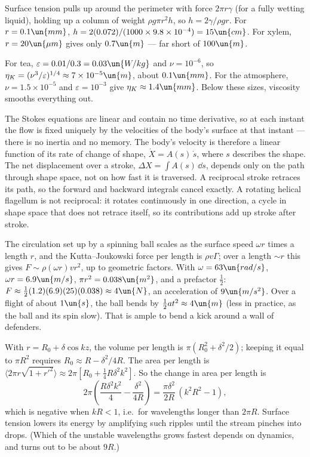  Surface tension pulls up around the perimeter with force $2\pi r\gamma$ (for a fully wetting liquid), holding up a column of weight $\rho g\pi r^2h$, so $h = 2\gamma/\rho gr$. For $r = 0.1\un{mm}$, $h = 2(0.072)/(1000\times9.8\times10^{-4}) = 15\un{cm}$. For xylem, $r = 20\un{\mu m}$ gives only $0.7\un{m}$ --- far short of $100\un{m}$.

 For tea, $\varepsilon = 0.01/0.3 = 0.03\un{W/kg}$ and $\nu = 10^{-6}$, so $\eta_K = (\nu^3/\varepsilon)^{1/4}\approx7\times10^{-5}\un{m}$, about $0.1\un{mm}$. For the atmosphere, $\nu = 1.5\times10^{-5}$ and $\varepsilon = 10^{-3}$ give $\eta_K\approx1.4\un{mm}$. Below these sizes, viscosity smooths everything out.

 The Stokes equations are linear and contain no time derivative, so at each instant the flow is fixed uniquely by the velocities of the body's surface at that instant --- there is no inertia and no memory. The body's velocity is therefore a linear function of its rate of change of shape, $\dot X = A(s)\,\dot s$, where $s$ describes the shape. The net displacement over a stroke, $\Delta X = \int A(s)\,\dd s$, depends only on the path through shape space, not on how fast it is traversed. A reciprocal stroke retraces its path, so the forward and backward integrals cancel exactly. A rotating helical flagellum is not reciprocal: it rotates continuously in one direction, a cycle in shape space that does not retrace itself, so its contributions add up stroke after stroke.

 The circulation set up by a spinning ball scales as the surface speed $\omega r$ times a length $r$, and the Kutta--Joukowski force per length is $\rho v\Gamma$; over a length $\sim r$ this gives $F\sim\rho(\omega r)vr^2$, up to geometric factors. With $\omega = 63\un{rad/s}$, $\omega r = 6.9\un{m/s}$, $\pi r^2 = 0.038\un{m^2}$, and a prefactor $\tfrac12$: $F\approx\tfrac12(1.2)(6.9)(25)(0.038)\approx4\un{N}$, an acceleration of $9\un{m/s^2}$. Over a flight of about $1\un{s}$, the ball bends by $\tfrac12at^2\approx4\un{m}$ (less in practice, as the ball and its spin slow). That is ample to bend a kick around a wall of defenders.

 With $r = R_0 + \delta\cos kz$, the volume per length is $\pi(R_0^2 + \delta^2/2)$; keeping it equal to $\pi R^2$ requires $R_0\approx R - \delta^2/4R$. The area per length is $\langle2\pi r\sqrt{1+r'^2}\rangle\approx2\pi[R_0 + \tfrac14R\delta^2k^2]$. So the change in area per length is
\[
  2\pi\left(\frac{R\delta^2k^2}{4} - \frac{\delta^2}{4R}\right) = \frac{\pi\delta^2}{2R}\,(k^2R^2 - 1),
\]
which is negative when $kR<1$, i.e.\ for wavelengths longer than $2\pi R$. Surface tension lowers its energy by amplifying such ripples until the stream pinches into drops. (Which of the unstable wavelengths grows fastest depends on dynamics, and turns out to be about $9R$.)
